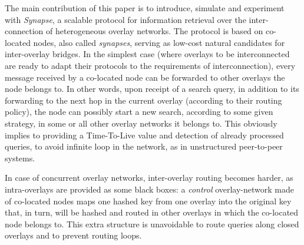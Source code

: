 %
 The main contribution of this paper is
to introduce, simulate and experiment with \emph{Synapse}, a scalable
protocol for information retrieval over the inter-connection of
heterogeneous overlay networks. The protocol is based on co-located
nodes, also called \emph{synapses}, serving as low-cost natural
candidates for inter-overlay bridges.  In the simplest case (where
overlays to be interconnected are ready to adapt their protocols to
the requirements of interconnection), every message received by a
co-located node can be forwarded to other overlays the node belongs
to. In other words, upon receipt of a search query, in addition to its
forwarding to the next hop in the current overlay (according to their
routing policy), the node can possibly start a new search, according
to some given strategy, in some or all other overlay networks it
belongs to. This obviously implies to providing a Time-To-Live value
and detection of already processed queries, to avoid infinite loop in
the network, as in unstructured peer-to-peer systems.


In case of concurrent overlay networks, inter-overlay routing becomes
harder, as intra-overlays are provided as some black boxes: a
\emph{control} overlay-network made of co-located nodes maps one
hashed key from one overlay into the original key that, in turn, will
be hashed and routed in other overlays in which the co-located node
belongs to. This extra structure is unavoidable to route queries along
closed overlays and to prevent routing loops.
 



